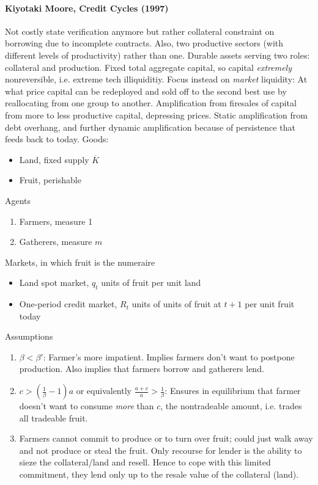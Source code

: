 \documentclass[12pt]{article}
\theoremstyle{plain}
\theoremstyle{definition}
\theoremstyle{remark}
\begin{document}
\paragraph{Kiyotaki Moore, Credit Cycles (1997)}
Not costly state verification anymore but rather collateral constraint
on borrowing due to incomplete contracts.
Also, two productive sectors (with different levels of productivity)
rather than one.
Durable assets serving two roles: collateral and production.
Fixed total aggregate capital, so capital \emph{extremely}
nonreversible, i.e. extreme tech illiquiditiy.
Focus instead on \emph{market} liquidity:
At what price capital can be redeployed and sold off to the second best
use by reallocating from one group to another.
Amplification from firesales of capital from more to less productive
capital, depressing prices.
Static amplification from debt overhang, and further dynamic
amplification because of persistence that feeds back to today.
Goods:
\begin{itemize}
  \item Land, fixed supply $\overline{K}$
  \item Fruit, perishable
\end{itemize}
Agents
\begin{enumerate}
  \item Farmers, measure 1
  \item Gatherers, measure $m$
\end{enumerate}
Markets, in which fruit is the numeraire
\begin{itemize}
  \item Land spot market, $q_t$ units of fruit per unit land
  \item One-period credit market,
    $R_t$ units of units of fruit at $t+1$ per unit fruit today
\end{itemize}
Assumptions
\begin{enumerate}
  \item $\beta<\beta'$: Farmer's more impatient. Implies farmers don't
    want to postpone production. Also implies that farmers borrow and
    gatherers lend.
  \item $c>\left(\frac{1}{\beta}-1\right)a$ or equivalently
    $\frac{a+c}{a}>\frac{1}{\beta}$:
    Ensures in equilibrium that farmer doesn't want to consume
    \emph{more} than $c$, the nontradeable amount, i.e. trades all
    tradeable fruit.
  \item Farmers cannot commit to produce or to turn over fruit; could
    just walk away and not produce or steal the fruit.
    Only recourse for lender is the ability to sieze the collateral/land
    and resell.
    Hence to cope with this limited commitment, they lend only up to the
    resale value of the collateral (land).
\end{enumerate}
\end{document}
